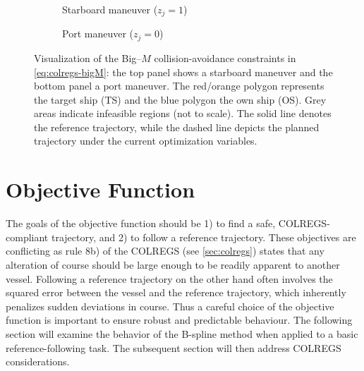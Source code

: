 \begin{figure}
    \centering
    \begin{subfigure}[t]{\textwidth}
        \centering
        
        \caption{Starboard maneuver ($z_j=1$)}
        \label{fig:non-convex-obstacle-mi-sb}
    \end{subfigure}
    \begin{subfigure}[t]{\textwidth}
        \centering
        
        \caption{Port maneuver ($z_j=0$)}
        \label{fig:non-convex-obstacle-mi-port}
    \end{subfigure}
    \caption{Visualization of the Big–$M$ collision-avoidance constraints in \cref{eq:colregs-bigM}: the top panel shows a starboard maneuver and the bottom panel a port maneuver. The red/orange polygon represents the target ship (TS) and the blue polygon the own ship (OS). Grey areas indicate infeasible regions (not to scale). The solid line denotes the reference trajectory, while the dashed line depicts the planned trajectory under the current optimization variables.}
    \label{fig:non-convex-obstacle-mi}
\end{figure}



\section{Objective Function}
The goals of the objective function should be 1) to find a safe, COLREGS-compliant trajectory, and 2) to follow a reference trajectory. These objectives are conflicting as rule 8b) of the COLREGS (see \cref{sec:colregs}) states that any alteration of course should be large enough to be readily apparent to another vessel. Following a reference trajectory on the other hand often involves the squared error between the vessel and the reference trajectory, which inherently penalizes sudden deviations in course. 
Thus a careful choice of the objective function is important to ensure robust and predictable behaviour. 
The following section will examine the behavior of the B-spline method when applied to a basic reference-following task. The subsequent section will then address COLREGS considerations.


